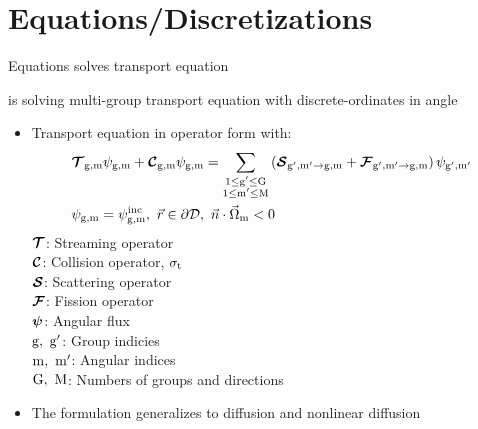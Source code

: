\section{Equations/Discretizations}
\begin{frame}{Equations  solves transport equation}
	\begin{block}{ is solving multi-group transport equation with discrete-ordinates in angle}
		\begin{itemize}
			\item Transport equation in operator form with:
			\begin{align}
			&\bm{\mathcal{T}}_{\mathrm{{g,m}}}\psi_{\mathrm{{g,m}}}+\bm{\mathcal{C}}_{\mathrm{{g,m}}}\psi_{\mathrm{{g,m}}}=\sum\limits_{\substack{1\leq\mathrm{{g'}}\leq\mathrm{{G}}\\1\leq\mathrm{{m'}}\leq\mathrm{{M}}}}\left(\bm{\mathcal{S}}_{\mathrm{{g',m'}}\to\mathrm{{g,m}}}+\bm{\mathcal{F}}_{\mathrm{{g',m'}}\to\mathrm{{g,m}}}\right)\psi_{\mathrm{{g',m'}}}\\
			&\psi_{\mathrm{{g,m}}}=\psi_{\mathrm{{g,m}}}^{\mathrm{{inc}}},\ \vec{r}\in{\partial\mathcal{D}},\ \vec{n}\cdot\vec{\Omega}_\mathrm{m}<0\nonumber
			\end{align}
				$\bm{\mathcal{T}}$: Streaming operator\\
				$\bm{\mathcal{C}}$: Collision operator, $\sigma_\mathrm{t}$\\
				$\bm{\mathcal{S}}$: Scattering operator\\
				$\bm{\mathcal{F}}$: Fission operator\\
				$\bm{\mathcal{\psi}}$: Angular flux\\
				$\mathrm{{g,\ g'}}$: Group indicies\\
				$\mathrm{{m,\ m'}}$: Angular indices\\
				$\mathrm{{G,\ M}}$: Numbers of groups and directions
			\item The formulation generalizes to diffusion and nonlinear diffusion
		\end{itemize}
	\end{block}
\end{frame}


